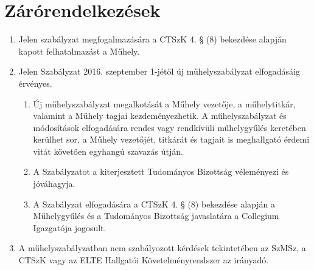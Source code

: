\documentclass{../styles/rulebook}
\begin{document}
\section{Zárórendelkezések}

\begin{enumerate}
	\item Jelen szabályzat megfogalmazására a CTSzK 4. § (8) bekezdése alapján kapott
	felhatalmazást a Műhely.
	\item Jelen Szabályzat 2016. szeptember 1-jétől új műhelyszabályzat elfogadásáig
	érvényes. 
	\begin{enumerate}
		\item Új műhelyszabályzat megalkotását a Műhely vezetője, a műhelytitkár, valamint
		a Műhely tagjai kezdeményezhetik. A műhelyszabályzat és módosítások	elfogadására rendes vagy rendkívüli műhelygyűlés keretében kerülhet sor, a Műhely vezetőjét, titkárát és tagjait is meghallgató érdemi vitát követően
		egyhangú szavazás útján.
		\item A Szabályzatot a kiterjesztett Tudományos Bizottság véleményezi és jóváhagyja.
		\item A Szabályzat elfogadására a CTSzK 4. § (8) bekezdése alapján a Műhelygyűlés és a Tudományos Bizottság javaslatára a Collegium Igazgatója jogosult.
	\end{enumerate}
	\item A műhelyszabályzatban nem szabályozott kérdések tekintetében az SzMSz, a CTSzK vagy az ELTE
	Hallgatói Követelményrendszer az irányadó.
\end{enumerate}
\end{document}
